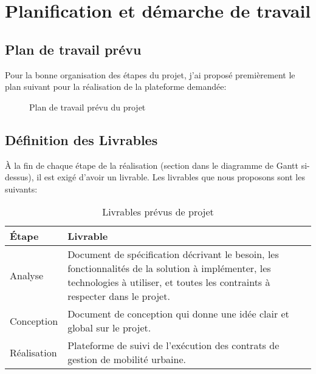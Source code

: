 \section{Planification et démarche de travail}
\subsection{Plan de travail prévu}
Pour la bonne organisation des étapes du projet, j'ai proposé premièrement le plan suivant pour la réalisation de la plateforme demandée:
\begin{figure}[H]
    \begin{center}
        \caption{Plan de travail prévu du projet}
    \end{center}
\end{figure}
\subsection{Définition des Livrables}
À la fin de chaque étape de la réalisation
(section dans le diagramme de Gantt si-dessus),
il est exigé d'avoir un livrable.
Les livrables que nous proposons sont les suivants:
\begin{table}[H]
    \begin{center}
        \begin{tabularx}{17.5cm}{|p{2cm}|X|}
            \hline
            \textbf{Étape} & \textbf{Livrable}                                                                                                                                                                  \\
            \hline
            Analyse        & Document de spécification décrivant le besoin, les fonctionnalités de la solution à implémenter, les technologies à utiliser, et toutes les contraints à respecter dans le projet. \\
            \hline
            Conception     & Document de conception qui donne une idée clair et global sur le projet.                                                                                                           \\
            \hline
            Réalisation    & Plateforme de suivi de l’exécution des contrats de gestion de mobilité urbaine.                                                                                                    \\
            \hline
        \end{tabularx}
        \caption{Livrables prévus de projet}
    \end{center}
\end{table}
